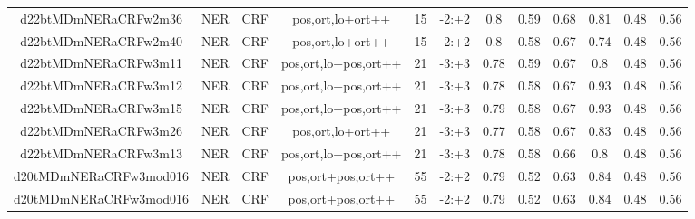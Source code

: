 \documentclass[a4paper]{article}
\begin{document}
\begin{landscape}
\begin{center}
\begin{tabular}{ |c|c|c|c|c|c|c|c|c|c|c|c|}
 	
 
 	
 		
 		\small{ d22btMDmNERaCRFw2m36 } & NER & CRF & pos,ort,lo+ort++  &  15 &  -2:+2  &  0.8 & 0.59 & 0.68  &  0.81 & 0.48 & 0.56 \\
 		

 	
 
 	
 		
 		\small{ d22btMDmNERaCRFw2m40 } & NER & CRF & pos,ort,lo+ort++  &  15 &  -2:+2  &  0.8 & 0.58 & 0.67  &  0.74 & 0.48 & 0.56 \\
 		

 	
 
 	
 		
 		\small{ d22btMDmNERaCRFw3m11 } & NER & CRF & pos,ort,lo+pos,ort++  &  21 &  -3:+3  &  0.78 & 0.59 & 0.67  &  0.8 & 0.48 & 0.56 \\
 		

 	
 
 	
 		
 		\small{ d22btMDmNERaCRFw3m12 } & NER & CRF & pos,ort,lo+pos,ort++  &  21 &  -3:+3  &  0.78 & 0.58 & 0.67  &  0.93 & 0.48 & 0.56 \\
 		

 	
 
 	
 		
 		\small{ d22btMDmNERaCRFw3m15 } & NER & CRF & pos,ort,lo+pos,ort++  &  21 &  -3:+3  &  0.79 & 0.58 & 0.67  &  0.93 & 0.48 & 0.56 \\
 		

 	
 
 	
 		
 		\small{ d22btMDmNERaCRFw3m26 } & NER & CRF & pos,ort,lo+ort++  &  21 &  -3:+3  &  0.77 & 0.58 & 0.67  &  0.83 & 0.48 & 0.56 \\
 		

 	
 
 	
 		
 		\small{ d22btMDmNERaCRFw3m13 } & NER & CRF & pos,ort,lo+pos,ort++  &  21 &  -3:+3  &  0.78 & 0.58 & 0.66  &  0.8 & 0.48 & 0.56 \\
 		

 	
 
 	
 		
 		\small{ d20tMDmNERaCRFw3mod016 } & NER & CRF & pos,ort+pos,ort++  &  55 &  -2:+2  &  0.79 & 0.52 & 0.63  &  0.84 & 0.48 & 0.56 \\
 		

 	
 
 	
 		
 		\small{ d20tMDmNERaCRFw3mod016 } & NER & CRF & pos,ort+pos,ort++  &  55 &  -2:+2  &  0.79 & 0.52 & 0.63  &  0.84 & 0.48 & 0.56 \\
 		


\end{tabular}
\end{center}
\end{landscape}
\end{document}
